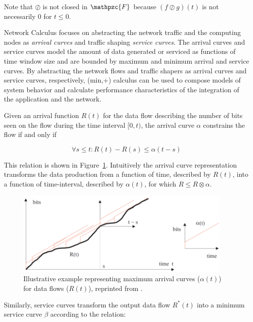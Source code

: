Note that $\oslash$ is not closed in $\mathpzc{F}$ because $(f\oslash
g)(t)$ is not necessarily $0$ for $t\leq0$.

Network Calculus focuses on abstracting the network traffic and the
computing nodes as \textit{arrival curves} and traffic shaping
\textit{service curves}. The arrival curves and service curves model
the amount of data generated or serviced as functions of time window
size and are bounded by maximum and minimum arrival and service
curves.  By abstracting the network flows and traffic shapers as
arrival curves and service curves, respectively, (min,+) calculus can
be used to compose models of system behavior and calculate performance
characteristics of the integration of the application and the network.

Given an arrival function $R(t)$ for the data flow describing the
number of bits seen on the flow during the time interval $[0,t)$, the
arrival curve $\alpha$ constrains the flow if and only if

\begin{equation}
  \forall s\leq t : R(t) -R(s) \leq \alpha(t-s)
\end{equation}

This relation is shown in Figure~\ref{fig:nc_arrival_curve}.
Intuitively the arrival curve representation transforms the data
production from a function of time, described by $R(t)$, into a
function of time-interval, described by $\alpha(t)$, for which $R\leq
R \otimes \alpha$.

\begin{figure}[htb]
  \centering
  \includegraphics[width=0.95\textwidth]{figs/nc_arrival_curve.png}
  \caption{Illustrative example representing maximum arrival curves
    ($\alpha(t)$) for data flows ($R(t)$), reprinted from
    \cite{NCBook}.}
  \label{fig:nc_arrival_curve}
\end{figure}

Similarly, service curves transform the output data flow $R^*(t)$
into a minimum service curve $\beta$ according to the relation:

